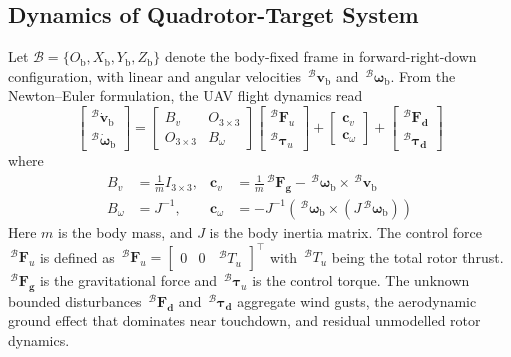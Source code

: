 \subsection{Dynamics of Quadrotor-Target System} \label{quadrotor dynamics: section}
Let $\mathcal{B}=\{O_{\text{b}},X_{\text{b}},Y_{\text{b}},Z_{\text{b}}\}$ denote the body-fixed frame in forward-right-down configuration, with linear and angular velocities $\,^\mathcal{B}\boldsymbol{v}_\text{b}$ and $\,^\mathcal{B}\boldsymbol{\omega}_\text{b}$. From the Newton--Euler formulation, the UAV flight dynamics read
\begin{equation}
\label{quadrotor dynamics: equation}
    \begin{bmatrix} ^\mathcal{B} \dot{\boldsymbol{v}}_{\text{b}} \\ ^\mathcal{B} \dot{\boldsymbol{\omega}}_{\text{b}} \end{bmatrix} = \begin{bmatrix} B_v & O_{3 \times 3} \\ O_{3 \times 3} & B_{\omega} \end{bmatrix} \begin{bmatrix} ^\mathcal{B} \boldsymbol{F}_u \\ ^\mathcal{B} \boldsymbol{\tau}_u \end{bmatrix} + \begin{bmatrix} \boldsymbol{c}_v \\ \boldsymbol{c}_{\omega} \end{bmatrix} + \begin{bmatrix} ^\mathcal{B} \boldsymbol{F_{\text{d}}} \\ ^\mathcal{B} \boldsymbol{\tau_{\text{d}}} \end{bmatrix}
 \end{equation}
 where
 \begin{align*}
     B_v &= \frac{1}{m} I_{3 \times 3}, & \boldsymbol{c}_v &= \frac{1}{m} \,^\mathcal{B} \boldsymbol{F_{\text{g}}} - \,^\mathcal{B} \boldsymbol{\omega}_{\text{b}} \times \,^\mathcal{B} \boldsymbol{v}_{\text{b}} \\ B_{\omega} &= J^{-1}, & \boldsymbol{c}_{\omega} &= - J^{-1}\left(\,^\mathcal{B} \boldsymbol{\omega}_{\text{b}} \times (J \,^\mathcal{B} \boldsymbol{\omega}_{\text{b}}) \right)
 \end{align*}
Here $m$ is the body mass, and $J$ is the body inertia matrix. The control force $\,^\mathcal{B} \boldsymbol{F}_u$ is defined as $\,^\mathcal{B} \boldsymbol{F}_u = \begin{bmatrix} 0 & 0 & \,^\mathcal{B} T_u\end{bmatrix}^\top $ with $\,^\mathcal{B} T_u$ being the total rotor thrust. $\,^\mathcal{B} \boldsymbol{F_{\text{g}}}$ is the gravitational force and $\,^\mathcal{B} \boldsymbol{\tau}_u$ is the control torque. The unknown bounded disturbances $\,^\mathcal{B} \boldsymbol{F_{\text{d}}}$ and $\,^\mathcal{B} \boldsymbol{\tau_{\text{d}}}$ aggregate wind gusts, the aerodynamic ground effect \cite{sanchez-cuevas2017} that dominates near touchdown, and residual unmodelled rotor dynamics.

